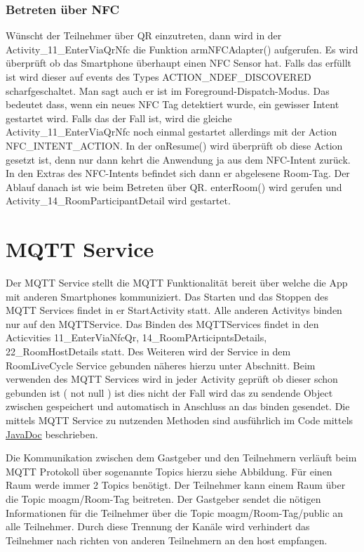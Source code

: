\subsubsection*{Betreten über NFC}
\label{subsec: Betreten über NFC}
Wünscht der Teilnehmer über QR einzutreten, dann wird in der Activity\_11\_EnterViaQrNfc die Funktion armNFCAdapter() aufgerufen. Es wird überprüft ob das Smartphone überhaupt einen NFC Sensor hat.
Falls das erfüllt ist wird dieser auf events des Types ACTION\_NDEF\_DISCOVERED scharfgeschaltet. 
Man sagt auch er ist im Foreground-Dispatch-Modus.
Das bedeutet dass, wenn ein neues NFC Tag detektiert wurde, ein gewisser Intent gestartet wird. 
Falls das der Fall ist, wird die gleiche Activity\_11\_EnterViaQrNfc noch einmal gestartet allerdings mit der Action NFC\_INTENT\_ACTION. 
In der onResume() wird überprüft ob diese Action gesetzt ist, denn nur dann kehrt die Anwendung ja aus dem NFC-Intent zurück. 
In den Extras des NFC-Intents befindet sich dann er abgelesene Room-Tag. Der Ablauf danach ist wie beim Betreten über QR. enterRoom() wird gerufen und Activity\_14\_RoomParticipantDetail wird gestartet.
\section{MQTT Service}
Der MQTT Service stellt die MQTT Funktionalität bereit über welche die App mit anderen Smartphones kommuniziert.
Das Starten und das Stoppen des MQTT Services findet in er StartActivity statt. Alle anderen Activitys binden nur auf den MQTTService. Das Binden des MQTTServices findet in den Acticvities 11\_EnterViaNfcQr, 14\_RoomPArticipntsDetails, 22\_RoomHostDetails statt. Des Weiteren wird der Service in dem RoomLiveCycle Service gebunden näheres hierzu unter Abschnitt.  Beim verwenden des MQTT Services wird in jeder Activity geprüft ob dieser schon gebunden ist ( not null ) ist dies nicht der Fall wird das zu sendende Object zwischen gespeichert und automatisch in Anschluss an das binden gesendet. 
Die mittels MQTT Service zu nutzenden Methoden sind ausführlich im Code mittels \href{https://scm.inftech.hs-mannheim.de/gogs/moa/20moagm/src/dev/Doku/javadoc}{JavaDoc} beschrieben. 

Die Kommunikation zwischen dem Gastgeber und den Teilnehmern verläuft beim MQTT Protokoll über sogenannte Topics hierzu siehe Abbildung. Für einen Raum werde immer 2 Topics benötigt. Der Teilnehmer kann einem Raum über die Topic moagm/Room-Tag beitreten. Der Gastgeber sendet die nötigen Informationen für die Teilnehmer über die Topic moagm/Room-Tag/public an alle Teilnehmer. Durch diese Trennung der Kanäle wird verhindert das Teilnehmer nach richten von anderen Teilnehmern an den host empfangen.

